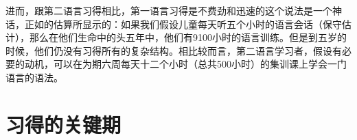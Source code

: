 
进而，跟第二语言习得相比，第一语言习得是不费劲和迅速的这个说法是一个神话，正如\citet[]{Klein86a-u}的估算所显示的：如果我们假设儿童每天听五个小时的语言会话（保守估计），那么在他们生命中的头五年中，他们有9100小时的语言训练。但是到五岁的时候，他们仍没有习得所有的复杂结构。相比较而言，第二语言学习者，假设有必要的动机，可以在为期六周每天十二个小时（总共500小时）的集训课上学会一门语言的语法。

\section{习得的关键期}


